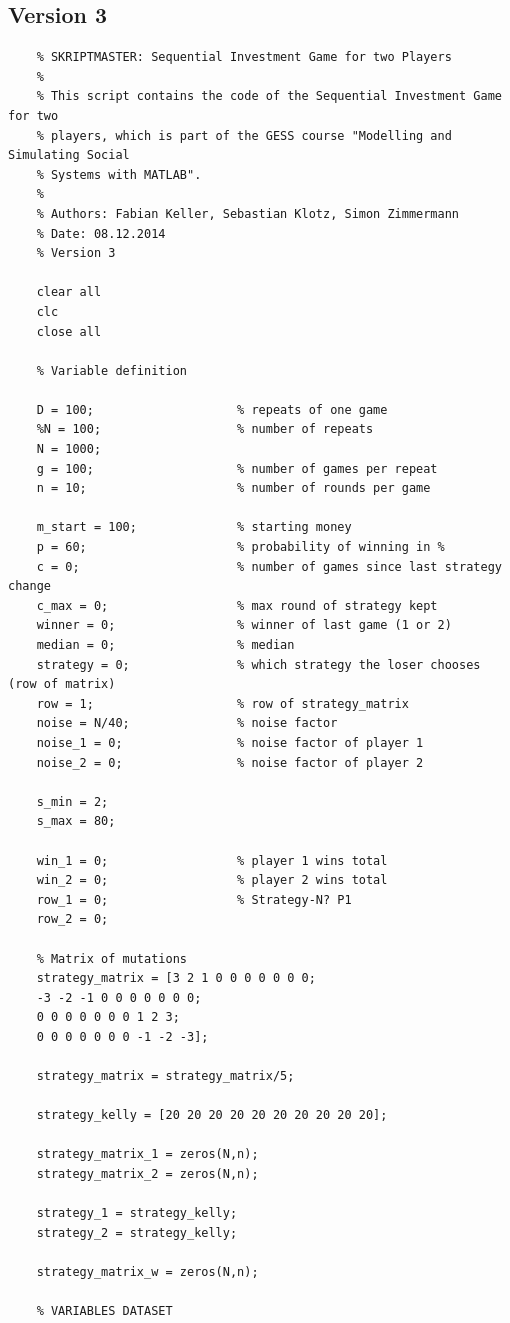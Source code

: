 \documentclass[11pt]{article}
\begin{document}
\subsection{Version 3}
\begin{lstlisting}
	% SKRIPTMASTER: Sequential Investment Game for two Players
	%
	% This script contains the code of the Sequential Investment Game for two
	% players, which is part of the GESS course "Modelling and Simulating Social
	% Systems with MATLAB".
	%
	% Authors: Fabian Keller, Sebastian Klotz, Simon Zimmermann
	% Date: 08.12.2014
	% Version 3
	
	clear all
	clc
	close all
	
	% Variable definition
	
	D = 100;                    % repeats of one game
	%N = 100;                   % number of repeats
	N = 1000;
	g = 100;                    % number of games per repeat
	n = 10;                     % number of rounds per game
	
	m_start = 100;              % starting money
	p = 60;                     % probability of winning in %
	c = 0;                      % number of games since last strategy change
	c_max = 0;                  % max round of strategy kept
	winner = 0;                 % winner of last game (1 or 2)
	median = 0;                 % median
	strategy = 0;               % which strategy the loser chooses (row of matrix)
	row = 1;                    % row of strategy_matrix
	noise = N/40;               % noise factor
	noise_1 = 0;                % noise factor of player 1
	noise_2 = 0;                % noise factor of player 2
	
	s_min = 2;
	s_max = 80;
	
	win_1 = 0;                  % player 1 wins total
	win_2 = 0;                  % player 2 wins total
	row_1 = 0;                  % Strategy-N? P1
	row_2 = 0;
	
	% Matrix of mutations
	strategy_matrix = [3 2 1 0 0 0 0 0 0 0;
	-3 -2 -1 0 0 0 0 0 0 0;
	0 0 0 0 0 0 0 1 2 3;
	0 0 0 0 0 0 0 -1 -2 -3];
	
	strategy_matrix = strategy_matrix/5;
	
	strategy_kelly = [20 20 20 20 20 20 20 20 20 20];
	
	strategy_matrix_1 = zeros(N,n);
	strategy_matrix_2 = zeros(N,n);
	
	strategy_1 = strategy_kelly;
	strategy_2 = strategy_kelly;
	
	strategy_matrix_w = zeros(N,n);
	
	% VARIABLES DATASET
	

\end{lstlisting}
\end{document}
